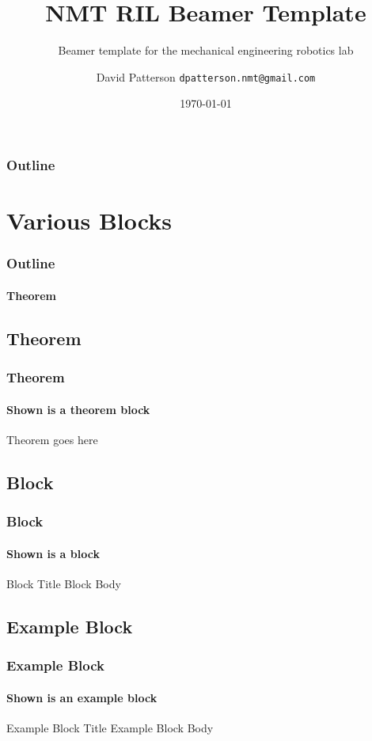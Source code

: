 \documentclass[compress, xcolor = svgnames, t]{beamer}
\title{NMT RIL Beamer Template}
\subtitle{Beamer template for the mechanical engineering robotics lab}
\author[DP]{David Patterson \texttt{dpatterson.nmt@gmail.com}}
\institute[NMT]{New Mexico Institute of Technology}
\date{\today}
\begin{document}
\begin{frame}[c]

	\titlepage

\end{frame}

\begin{frame}\frametitle{Outline}
	\tableofcontents[hidesubsections]
\end{frame}

\section{Various Blocks} %
\label{sec:various_blocks}

\begin{frame}\frametitle{Outline}\framesubtitle{Theorem}
\end{frame}

\subsection{Theorem} %
\label{sub:theorem}

\begin{frame}\frametitle{Theorem}
	\framesubtitle{Shown is a theorem block}

	\begin{theorem}
		Theorem goes here
	\end{theorem}
\end{frame}


\subsection{Block} %
\label{sub:block}

\begin{frame}\frametitle{Block}\framesubtitle{Shown is a block} 
\begin{block}{Block Title}
Block Body
\end{block}
\end{frame}


\subsection{Example Block} %
\label{sub:example_block}

\begin{frame}\frametitle{Example Block}\framesubtitle{Shown is an example block}
\begin{example}{Example Block Title}
Example Block Body
\end{example}
\end{frame}
\end{document}

